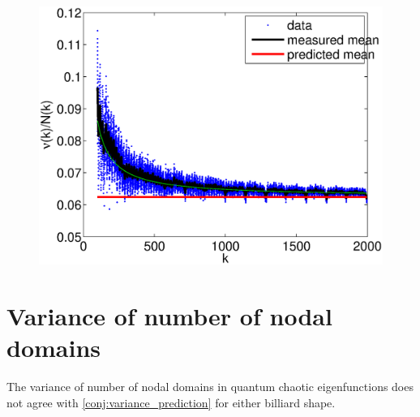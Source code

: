 \documentclass{report}
\begin{document}
\begin{figure}
  \begin{center}
    \includegraphics[width=\textwidth]{figs/results/perc_100_to_2000_mean.eps}
  \end{center}
\end{figure}


\section{Variance of number of nodal domains}
The variance of number of nodal domains in quantum chaotic eigenfunctions does not agree with \ref{conj:variance_prediction} for either billiard shape.
\end{document}
